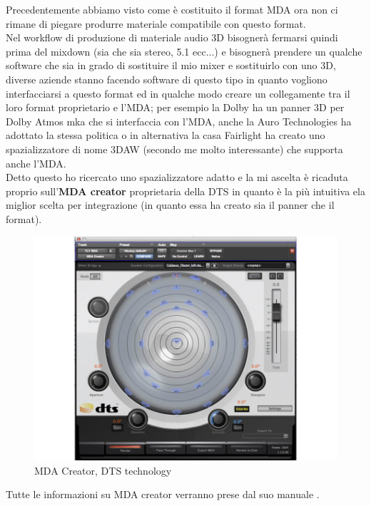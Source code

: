 \documentclass[12pt,a4paper]{report}
\begin{document}
Precedentemente abbiamo visto come è costituito il format MDA ora non ci rimane di piegare produrre materiale compatibile con questo format.\\

Nel workflow di produzione di materiale audio 3D bisognerà fermarsi quindi prima del mixdown (sia che sia stereo, 5.1 ecc...) e bisognerà prendere un qualche software che sia in grado di sostituire il mio mixer e sostituirlo con uno 3D, diverse aziende stanno facendo software di questo tipo in quanto vogliono interfacciarsi a questo format ed in qualche modo creare un collegamente tra il loro format proprietario e l'MDA; per esempio la Dolby ha un panner 3D per Dolby Atmos mka che si interfaccia con l'MDA, anche la Auro Technologies ha adottato la stessa politica o in alternativa la casa Fairlight ha creato uno spazializzatore di nome 3DAW (secondo me molto interessante) che supporta anche l'MDA.\\

Detto questo ho ricercato uno spazializzatore adatto e la mi ascelta è ricaduta proprio sull'\textbf{MDA creator} proprietaria della DTS in quanto è la più intuitiva ela miglior scelta per integrazione (in quanto essa ha creato sia il panner che il format).

\begin{figure}[htbp]
	\centering
	\includegraphics[scale=0.50]{figures/mdacreator.jpg}
	
	\caption {MDA Creator, DTS technology} 
	\label{fig:mdacreator}
	\end{figure}

Tutte le informazioni su MDA creator verranno prese dal suo manuale \cite{creator}.\\
\end{document}
